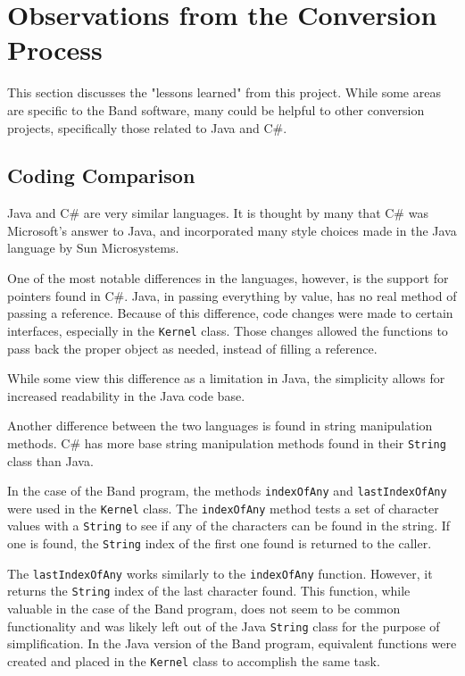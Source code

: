 \documentclass[project]{bsu-ms}
\begin{document}
%
%
\chapter{Observations from the Conversion Process}\label{ch:observations}

This section discusses the "lessons learned" from this project. While some areas are specific to the Band software, many could be helpful to other conversion projects, specifically those related to Java and C\#.



\section{Coding Comparison}\label{sec:codingComparison}
Java and C\# are very similar languages. It is thought by many that C\# was Microsoft's answer to Java, and incorporated many style choices made in the Java language by Sun Microsystems.

One of the most notable differences in the languages, however, is the support for pointers found in C\#. Java, in passing everything by value, has no real method of passing a reference. Because of this difference, code changes were made to certain interfaces, especially in the \texttt{Kernel} class. Those changes allowed the functions to pass back the proper object as needed, instead of filling a reference. 

While some view this difference as a limitation in Java, the simplicity allows for increased readability in the Java code base.

Another difference between the two languages is found in string manipulation methods. C\# has more base string manipulation methods found in their \texttt{String} class than Java. 

In the case of the Band program, the methods \texttt{indexOfAny} and \texttt{lastIndexOfAny} were used in the \texttt{Kernel} class. The \texttt{indexOfAny} method tests a set of character values with a \texttt{String} to see if any of the characters can be found in the string. If one is found, the \texttt{String} index of the first one found is returned to the caller.

The \texttt{lastIndexOfAny} works similarly to the \texttt{indexOfAny} function. However, it returns the \texttt{String} index of the last character found. This function, while valuable in the case of the Band program, does not seem to be common functionality and was likely left out of the Java \texttt{String} class for the purpose of simplification. In the Java version of the Band program, equivalent functions were created and placed in the \texttt{Kernel} class to accomplish the same task.
\end{document}
